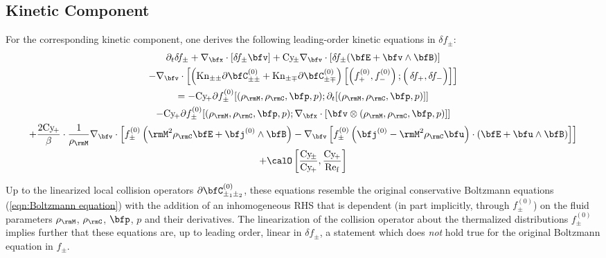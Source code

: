     \subsection*{Kinetic Component}
        For the corresponding kinetic component, one derives the following leading-order kinetic equations in $\delta\!f_{\pm}$:
        \begin{multline}\label{eqn:linearized Boltzmann equation}
            \partial_{t}\delta\!f_{\pm} + \nabla_{\bfx}\cdot[\delta\!f_{\pm}\bfv] + \rmCy\!_{\pm}\nabla_{\bfv}\cdot[\delta\!f_{\pm}(\bfE + \bfv\wedge\bfB)]  \\
            - \nabla_{\bfv}\cdot\left[\left(\rmKn_{\pm\pm}\partial\bfC_{\pm\pm}^{(0)} + \rmKn_{\pm\mp}\partial\bfC_{\pm\mp}^{(0)}\right)\left[\left(f_{+}^{(0)}, f_{-}^{(0)}\right); \left({\color{white} f_{+}^{(0)}}\!\!\!\!\!\!\!\!\!\delta\!f_{+}, \delta\!f_{-}\right)\right]\right]  \\
            =  - \rmCy\!_{+}\partial f_{\pm}^{(0)}[(\rho_{\rmM}, \rho_{\rmC}, \bfp, p); \partial_{t}[(\rho_{\rmM}, \rho_{\rmC}, \bfp, p)]]  \\
            - \rmCy\!_{+}\partial f_{\pm}^{(0)}[(\rho_{\rmM}, \rho_{\rmC}, \bfp, p); \nabla_{\bfx}\cdot[\bfv\otimes(\rho_{\rmM}, \rho_{\rmC}, \bfp, p)]]  \\
            + \frac{2\rmCy\!_{+}}{\beta}\cdot\frac{1}{\rho_{\rmM}}\nabla_{\bfv}\cdot\left[f_{\pm}^{(0)}\left(\rmM^{2}\rho_{\rmC}\bfE + \bfj^{(0)}\wedge\bfB\right) - \nabla_{\bfv}\left[f_{\pm}^{(0)}\left(\bfj^{(0)} - \rmM^{2}\rho_{\rmC}\bfu\right)\cdot\left(\bfE + \bfu\wedge\bfB\right)\right]\right]  \\
            + \calO\left[\frac{\rmCy\!_{\pm}}{\rmCy\!_{+}}, \frac{\rmCy\!_{+}}{\rmRef}\right]
        \end{multline}
        
        Up to the linearized local collision operators $\partial\bfC_{\pm_{1}\pm_{2}}^{(0)}$, these equations resemble the original conservative Boltzmann equations (\ref{eqn:Boltzmann equation}) with the addition of an inhomogeneous RHS that is dependent (in part implicitly, through $f_{\pm}^{(0)}$) on the fluid parameters $\rho_{\rmM}$, $\rho_{\rmC}$, $\bfp$, $p$ and their derivatives. The linearization of the collision operator about the thermalized distributions $f_{\pm}^{(0)}$ implies further that these equations are, up to leading order, linear in $\delta\!f_{\pm}$, a statement which does \emph{not} hold true for the original Boltzmann equation in $f_{\pm}$.

